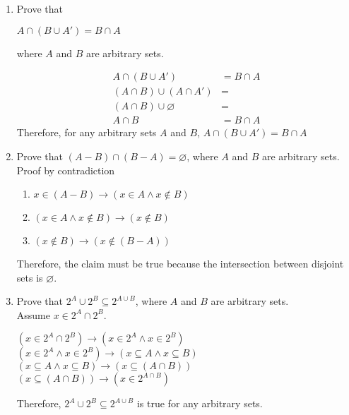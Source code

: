 \documentclass[12pt,twoside]{article}
\begin{document}
\begin{enumerate}
	\item
	Prove that
	\begin{center}
		$ A \cap (B \cup A') =   B\cap A$
	\end{center}
	where $A$ and $B$ are arbitrary sets.

	\begin{align*}
		A \cap (B \cup A') &= B \cap A\\
		(A \cap B) \cup (A \cap A') &=\\
		(A \cap B) \cup \varnothing &=\\
		A \cap B &= B \cap A
	\end{align*}
	Therefore, for any arbitrary sets $A$ and $B$, $ A \cap (B \cup A') =   B\cap A$



	\newpage
	\item
	Prove that $(A-B) \cap (B-A) = \varnothing$, where $A$ and $B$ are arbitrary sets.\\

	Proof by contradiction

	\begin{enumerate}
		\item $x \in (A - B) \to (x \in A \land x \notin B)$
		\item $(x \in A \land x \notin B) \to (x \notin B)$
		\item $(x \notin B) \to (x \notin (B - A))$
	\end{enumerate}

	Therefore, the claim must be true because the intersection between disjoint sets is $\varnothing$.

	\newpage
	\item
	Prove that $2^A \cup 2^B \subseteq 2^{A \cup B}$, where $A$ and $B$ are arbitrary sets. \\

		Assume $x \in 2^A \cap 2^B$.

		$(x \in 2^A \cap 2^B) \to (x \in 2^A \land x \in 2^B)$\\
		$(x \in 2^A \land x \in 2^B) \to (x \subseteq A \land x \subseteq B)$\\
		$(x \subseteq A \land x \subseteq B) \to (x \subseteq (A \cap B))$\\
		$(x \subseteq (A \cap B)) \to (x \in 2^{A \cap B})$

		Therefore, $2^A \cup 2^B \subseteq 2^{A \cup B}$ is true for any arbitrary sets.

\end{enumerate}
%
%
\newpage
\end{document}
